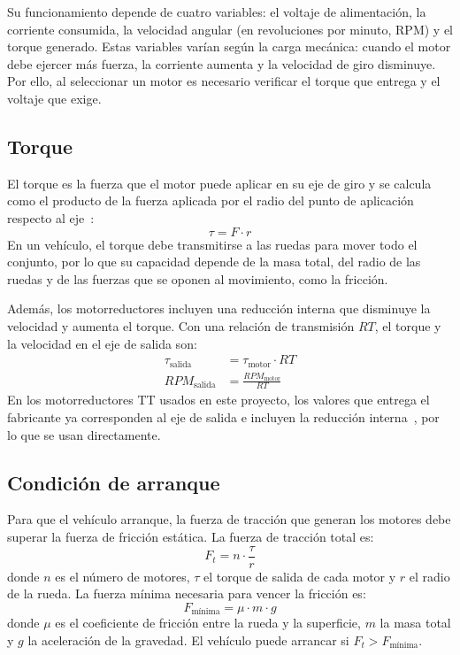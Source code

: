 \documentclass[journal]{IEEEtran}
\begin{document}
Su funcionamiento depende de cuatro variables: el voltaje de alimentación, la corriente consumida, la velocidad angular (en revoluciones por minuto, RPM) y el torque generado. Estas variables varían según la carga mecánica: cuando el motor debe ejercer más fuerza, la corriente aumenta y la velocidad de giro disminuye. Por ello, al seleccionar un motor es necesario verificar el torque que entrega y el voltaje que exige.

\subsection{Torque}
El torque es la fuerza que el motor puede aplicar en su eje de giro y se calcula como el producto de la fuerza aplicada por el radio del punto de aplicación respecto al eje~\cite{krause}:
\begin{equation}
\tau = F \cdot r
\end{equation}
En un vehículo, el torque debe transmitirse a las ruedas para mover todo el conjunto, por lo que su capacidad depende de la masa total, del radio de las ruedas y de las fuerzas que se oponen al movimiento, como la fricción.

Además, los motorreductores incluyen una reducción interna que disminuye la velocidad y aumenta el torque. Con una relación de transmisión $RT$, el torque y la velocidad en el eje de salida son:
\begin{align}
\tau_{\text{salida}} &= \tau_{\text{motor}} \cdot RT\\
RPM_{\text{salida}} &= \frac{RPM_{\text{motor}}}{RT}
\end{align}
En los motorreductores TT usados en este proyecto, los valores que entrega el fabricante ya corresponden al eje de salida e incluyen la reducción interna~\cite{tt}, por lo que se usan directamente.

\subsection{Condición de arranque}
Para que el vehículo arranque, la fuerza de tracción que generan los motores debe superar la fuerza de fricción estática. La fuerza de tracción total es:
\begin{equation}
F_t = n \cdot \frac{\tau}{r}
\end{equation}
donde $n$ es el número de motores, $\tau$ el torque de salida de cada motor y $r$ el radio de la rueda. La fuerza mínima necesaria para vencer la fricción es:
\begin{equation}
F_{\text{mínima}} = \mu \cdot m \cdot g
\end{equation}
donde $\mu$ es el coeficiente de fricción entre la rueda y la superficie, $m$ la masa total y $g$ la aceleración de la gravedad. El vehículo puede arrancar si $F_t > F_{\text{mínima}}$.
\end{document}
